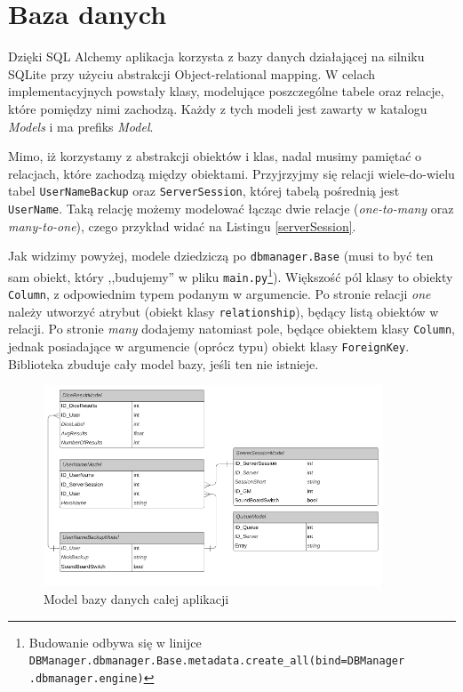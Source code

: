 \documentclass[shortabstract,inz]{iithesis}
\begin{document}
		\section{Baza danych}
		Dzięki SQL Alchemy aplikacja korzysta z bazy danych działającej na silniku SQLite przy użyciu abstrakcji Object-relational mapping. W celach implementacyjnych powstały klasy, modelujące poszczególne tabele oraz relacje, które pomiędzy nimi zachodzą. Każdy z tych modeli jest zawarty w katalogu \textit{Models} i ma prefiks \textit{Model}.
		
		Mimo, iż korzystamy z abstrakcji obiektów i klas, nadal musimy pamiętać o relacjach, które zachodzą między obiektami. Przyjrzyjmy się relacji wiele-do-wielu tabel \texttt{UserNameBackup} oraz \texttt{ServerSession}, której tabelą pośrednią jest \texttt{UserName}. Taką relację możemy modelować łącząc dwie relacje (\textit{one-to-many} oraz \textit{many-to-one}), czego przykład widać na Listingu \ref{serverSession}.
		
		
		
		Jak widzimy powyżej, modele dziedziczą po \texttt{dbmanager.Base} (musi to być ten sam obiekt, który ,,budujemy'' w pliku \texttt{main.py}\footnote{Budowanie odbywa się w linijce \texttt{DBManager.dbmanager.Base.metadata.create\_all(bind=DBManager
				.dbmanager.engine)}}). Większość pól klasy to obiekty \texttt{Column}, z odpowiednim typem podanym w argumencie. Po stronie relacji \textit{one} należy utworzyć atrybut (obiekt klasy \texttt{relationship}), będący listą obiektów w relacji. Po stronie \textit{many} dodajemy natomiast pole, będące obiektem klasy \texttt{Column}, jednak posiadające w argumencie (oprócz typu) obiekt klasy \texttt{ForeignKey}. Biblioteka zbuduje cały model bazy, jeśli ten nie istnieje.
		
		

		\begin{figure}[h!]
			\centering
			\includegraphics[width=0.90\textwidth]{dbmodels}
			\caption{Model bazy danych całej aplikacji}
		\end{figure}
	
\end{document}
